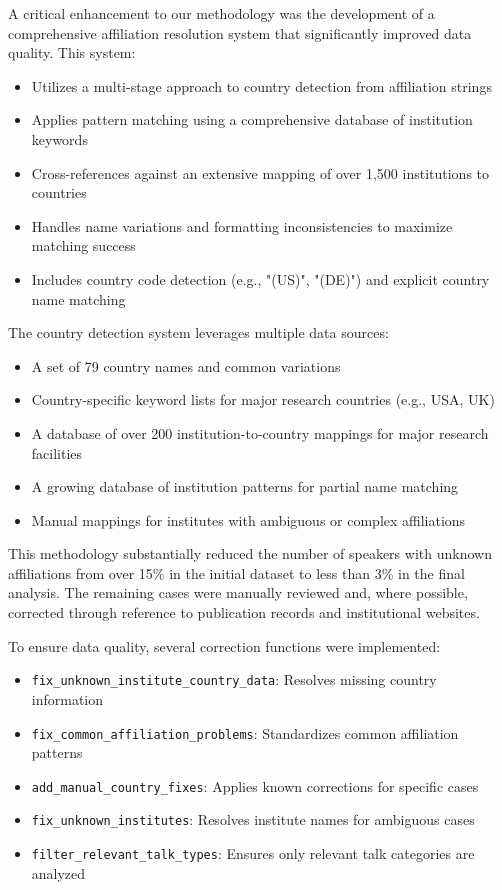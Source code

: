 \documentclass[a4paper,11pt]{article}
\begin{document}
A critical enhancement to our methodology was the development of a comprehensive affiliation resolution system that significantly improved data quality. This system:
\begin{itemize}
    \item Utilizes a multi-stage approach to country detection from affiliation strings
    \item Applies pattern matching using a comprehensive database of institution keywords
    \item Cross-references against an extensive mapping of over 1,500 institutions to countries
    \item Handles name variations and formatting inconsistencies to maximize matching success
    \item Includes country code detection (e.g., "(US)", "(DE)") and explicit country name matching
\end{itemize}

The country detection system leverages multiple data sources:
\begin{itemize}
    \item A set of 79 country names and common variations
    \item Country-specific keyword lists for major research countries (e.g., USA, UK)
    \item A database of over 200 institution-to-country mappings for major research facilities
    \item A growing database of institution patterns for partial name matching
    \item Manual mappings for institutes with ambiguous or complex affiliations
\end{itemize}

This methodology substantially reduced the number of speakers with unknown affiliations from over 15\% in the initial dataset to less than 3\% in the final analysis. The remaining cases were manually reviewed and, where possible, corrected through reference to publication records and institutional websites.

To ensure data quality, several correction functions were implemented:
\begin{itemize}
    \item \texttt{fix\_unknown\_institute\_country\_data}: Resolves missing country information
    \item \texttt{fix\_common\_affiliation\_problems}: Standardizes common affiliation patterns
    \item \texttt{add\_manual\_country\_fixes}: Applies known corrections for specific cases
    \item \texttt{fix\_unknown\_institutes}: Resolves institute names for ambiguous cases
    \item \texttt{filter\_relevant\_talk\_types}: Ensures only relevant talk categories are analyzed
\end{itemize}
\end{document}
